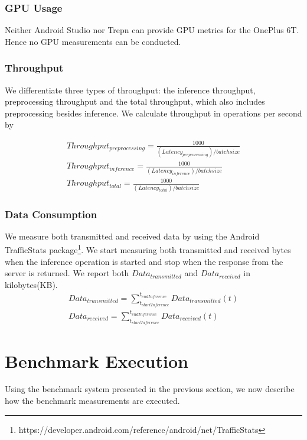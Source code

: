 \subsubsection{GPU Usage}
Neither Android Studio nor Trepn can provide GPU metrics for the OnePlus 6T. Hence no GPU measurements can be conducted.
\subsubsection{Throughput}
We differentiate three types of throughput: the inference throughput, preprocessing throughput and the total throughput, which also includes preprocessing besides inference.
We calculate throughput in operations per second by 

\begin{equation*}
\begin{gathered}
Throughput_{preprocessing} =\frac{1000}{(Latency_{preprocessing}) / batchsize}\\
Throughput_{inference} =\frac{1000}{(Latency_{inference}) / batchsize}\\
Throughput_{total}  =\frac{1000}{(Latency_{total}) / batchsize}
\end{gathered}
\end{equation*}
\subsubsection{Data Consumption}
We measure both transmitted and received data by using the Android TrafficStats package\footnote{https://developer.android.com/reference/android/net/TrafficStats}. We start measuring both transmitted and received bytes when the inference operation is started and stop when the response from the server is returned. We report both $Data_{transmitted}$ and $Data_{received}$ in kilobytes(KB).
\begin{equation*}
\begin{gathered}
Data_{transmitted} = \sum_{t_{startInference}}^{t_{endInference}} Data_{transmitted}(t)\\
Data_{received} = \sum_{t_{startInference}}^{t_{endInference}} Data_{received}(t)
\end{gathered}
\end{equation*}

\section{Benchmark Execution}
\label{chap:benchmarkExec}
Using the benchmark system presented in the previous section, we now describe how the benchmark measurements are executed.


